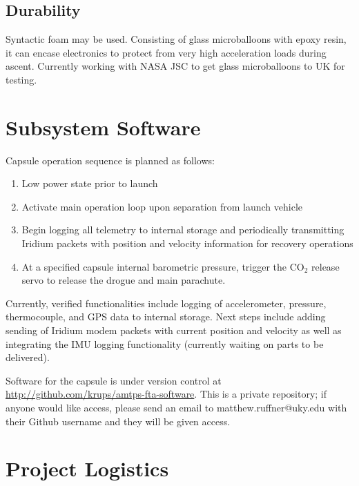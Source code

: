 \documentclass{article}
\begin{document}
\subsection{Durability}
Syntactic foam may be used. Consisting of glass microballoons with epoxy resin, it can encase electronics to protect from very high acceleration loads during ascent. Currently working with NASA JSC to get glass microballoons to UK for testing.


\section{Subsystem Software}
\label{sec:software}

Capsule operation sequence is planned as follows:

\begin{enumerate}
	\item Low power state prior to launch
	\item Activate main operation loop upon separation from launch vehicle
	\item Begin logging all telemetry to internal storage and periodically transmitting Iridium packets with position and velocity information for recovery operations
	\item At a specified capsule internal barometric pressure, trigger the CO$_2$ release servo to release the drogue and main parachute.
\end{enumerate}

Currently, verified functionalities include logging of accelerometer, pressure, thermocouple, and GPS data to internal storage. Next steps include adding sending of Iridium modem packets with current position and velocity as well as integrating the IMU logging functionality (currently waiting on parts to be delivered).

Software for the capsule is under version control at \url{http://github.com/krups/amtps-fta-software}. This is a private repository; if anyone would like access, please send an email to matthew.ruffner@uky.edu with their Github username and they will be given access.

\section{Project Logistics}
\label{sec:logistics}
\end{document}
